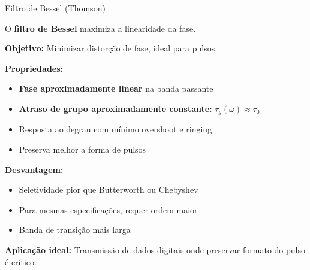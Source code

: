 
\begin{frame}{Filtro de Bessel (Thomson)}

O \textbf{filtro de Bessel} maximiza a linearidade da fase.

\textbf{Objetivo:} Minimizar distorção de fase, ideal para pulsos.

\textbf{Propriedades:}

\begin{itemize}
\item \textbf{Fase aproximadamente linear} na banda passante
\item \textbf{Atraso de grupo aproximadamente constante:} $\tau_g(\omega) \approx \tau_0$
\item Resposta ao degrau com mínimo overshoot e ringing
\item Preserva melhor a forma de pulsos
\end{itemize}

\vspace{0.1cm}

\textbf{Desvantagem:}

\begin{itemize}
\item Seletividade pior que Butterworth ou Chebyshev
\item Para mesmas especificações, requer ordem maior
\item Banda de transição mais larga
\end{itemize}

\vspace{0.1cm}

\textbf{Aplicação ideal:} Transmissão de dados digitais onde preservar formato do pulso é crítico.

\end{frame}


